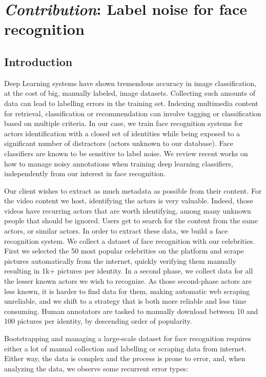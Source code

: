 \chapter{\emph{\arr Contribution}: Label noise for face recognition}
\label{chap:noise}

\section{Introduction}

Deep Learning systems have shown tremendous accuracy in image classification, at the cost of big, manually labeled, image datasets. Collecting such amounts of data can lead to labelling errors in the training set. Indexing multimedia content for retrieval, classification or recommendation can involve tagging or classification based on multiple criteria. In our case, we train face recognition systems for actors identification with a closed set of identities while being exposed to a significant number of distractors (actors unknown to our database). Face classifiers are known to be sensitive to label noise. We review recent works on how to manage noisy annotations when training deep learning classifiers, independently from our interest in face recognition.

Our client wishes to extract as much metadata as possible from their content. For the video content we host, identifying the actors is very valuable. Indeed, those videos have recurring actors that are worth identifying, among many unknown people that should be ignored. Users get to search for the content from the same actors, or similar actors. In order to extract these data, we build a face recognition system. We collect a dataset of face recognition with our celebrities. First we selected the 50 most popular celebrities on the platform and scrape pictures automatically from the internet, quickly verifying them manually resulting in 1k+ pictures per identity. In a second phase, we collect data for all the lesser known actors we wish to recognize. As those second-phase actors are less known, it is harder to find data for them, making automatic web scraping unreliable, and we shift to a strategy that is both more reliable and less time consuming. Human annotators are tasked to manually download between 10 and 100 pictures per identity, by descending order of popularity.

Bootstrapping and managing a large-scale dataset for face recognition requires either a lot of manual collection and labelling or scraping data from internet. Either way, the data is complex and the process is prone to error, and, when analyzing the data, we observe some recurrent error types:

